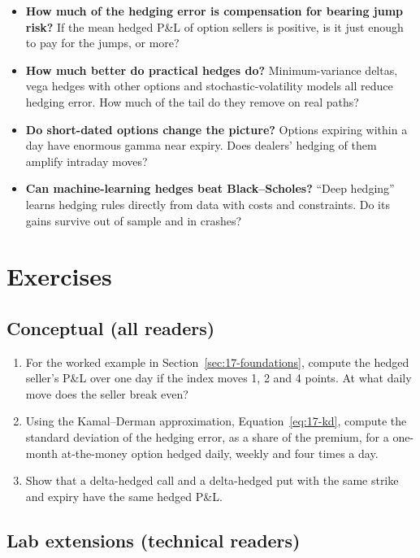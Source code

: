 \begin{itemize}
  \item \textbf{How much of the hedging error is compensation for bearing jump risk?} If the mean hedged P\&L of option sellers is positive, is it just enough to pay for the jumps, or more?
  \item \textbf{How much better do practical hedges do?} Minimum-variance deltas, vega hedges with other options and stochastic-volatility models all reduce hedging error. How much of the tail do they remove on real paths?
  \item \textbf{Do short-dated options change the picture?} Options expiring within a day have enormous gamma near expiry. Does dealers' hedging of them amplify intraday moves?
  \item \textbf{Can machine-learning hedges beat Black--Scholes?} ``Deep hedging'' learns hedging rules directly from data with costs and constraints. Do its gains survive out of sample and in crashes?
\end{itemize}

\section*{Exercises}

\subsection*{Conceptual (all readers)}

\begin{enumerate}
  \item For the worked example in Section~\ref{sec:17-foundations}, compute the hedged seller's P\&L over one day if the index moves 1, 2 and 4 points. At what daily move does the seller break even?
  \item Using the Kamal--Derman approximation, Equation~\eqref{eq:17-kd}, compute the standard deviation of the hedging error, as a share of the premium, for a one-month at-the-money option hedged daily, weekly and four times a day.
  \item Show that a delta-hedged call and a delta-hedged put with the same strike and expiry have the same hedged P\&L.
\end{enumerate}

\subsection*{Lab extensions (technical readers)}

